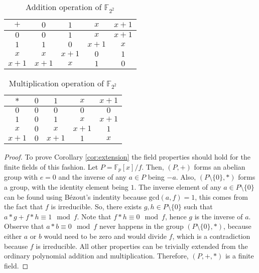\documentclass{ufsctex/ufsctex}
\begin{document}
\begin{table}
\begin{center}
\begin{tabular}{c|cccc}
$+$   & $0$   & $1$   & $x$   & $x+1$ \\
\hline
$0$   & $0$   & $1$   & $x$   & $x+1$ \\
$1$   & $1$   & $0$   & $x+1$ & $x$   \\
$x$   & $x$   & $x+1$ & $0$   & $1$   \\
$x+1$ & $x+1$ & $x$   & $1$   & $0$   \\
\end{tabular}
\caption{Addition operation of $\mathbb{F}_{2^2}$}
\label{tab:addition}
\end{center}
\end{table}

\begin{table}
\begin{center}
\begin{tabular}{c|cccc}
$*$   & $0$ & $1$   & $x$   & $x+1$ \\
\hline
$0$   & $0$ & $0$   & $0$   & $0$   \\
$1$   & $0$ & $1$   & $x$   & $x+1$ \\
$x$   & $0$ & $x$   & $x+1$ & $1$   \\
$x+1$ & $0$ & $x+1$ & $1$   & $x$   \\
\end{tabular}
\caption{Multiplication operation of $\mathbb{F}_{2^2}$}
\label{tab:multiplication}
\end{center}
\end{table}

\begin{proof}
To prove Corollary \ref{cor:extension} the field properties should hold for the
finite fields of this fashion. Let $P = \mathbb{F}_p[x]/f$. Then, $(P, +)$
forms an abelian group with $e = 0$ and the inverse of any $a \in P$ being
$-a$. Also, $(P \setminus \{0\}, *)$ forms a group, with the identity element
being $1$. The inverse element of any $a \in P \setminus \{0\}$ can be found
using Bézout's indentity because $\text{gcd}(a, f) = 1$, this comes from the
fact that $f$ is irreducible. So, there exists $g, h \in P \setminus \{0\}$
such that $a*g + f*h \equiv 1 \mod f$. Note that $f*h \equiv 0 \mod f$, hence
$g$ is the inverse of $a$. Observe that $a*b \equiv 0 \mod f$ never happens in
the group $(P \setminus \{0\}, *)$, because either $a$ or $b$ would need to be
zero and would divide $f$, which is a contradiction because $f$ is irreducible.
All other properties can be trivially extended from the ordinary polynomial
addition and multiplication. Therefore, $(P, +, *)$ is a finite field.
\end{proof}
\end{document}

